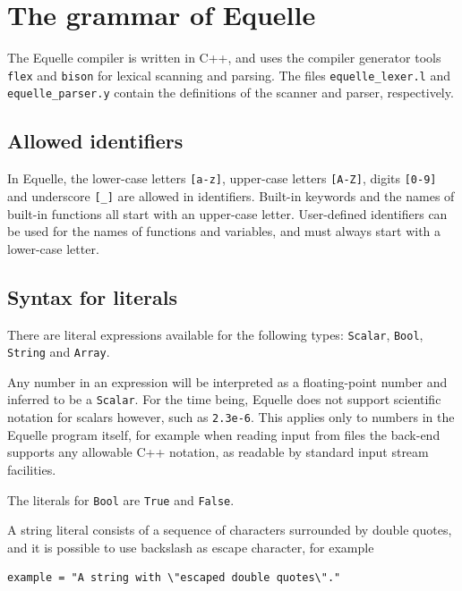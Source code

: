 \documentclass[11pt]{article}
\newcommand{\code}[1]{\texttt{#1}}
\begin{document}
\section{The grammar of Equelle}

The Equelle compiler is written in C++, and uses the compiler generator tools \code{flex}
and \code{bison} for lexical scanning and parsing. The files \code{equelle\_lexer.l} and
\code{equelle\_parser.y} contain the definitions of the scanner and parser, respectively.

\subsection{Allowed identifiers}

In Equelle, the lower-case letters \code{[a-z]}, upper-case letters \code{[A-Z]}, digits
\code{[0-9]} and underscore \code{[\_]} are allowed in identifiers. Built-in keywords and
the names of built-in functions all start with an upper-case letter. User-defined
identifiers can be used for the names of functions and variables, and must always start
with a lower-case letter.

\subsection{Syntax for literals}

There are literal expressions available for the following types: \code{Scalar},
\code{Bool}, \code{String} and \code{Array}.

Any number in an expression will be interpreted as a floating-point number and inferred to
be a \code{Scalar}. For the time being, Equelle does not support scientific notation for
scalars however, such as \code{2.3e-6}. This applies only to numbers in the Equelle
program itself, for example when reading input from files the back-end supports any
allowable C++ notation, as readable by standard input stream facilities.

The literals for \code{Bool} are \code{True} and \code{False}.

A string literal consists of a sequence of characters surrounded by double quotes, and it
is possible to use backslash as escape character, for example
\begin{verbatim}
example = "A string with \"escaped double quotes\"."
\end{verbatim}

\end{document}
